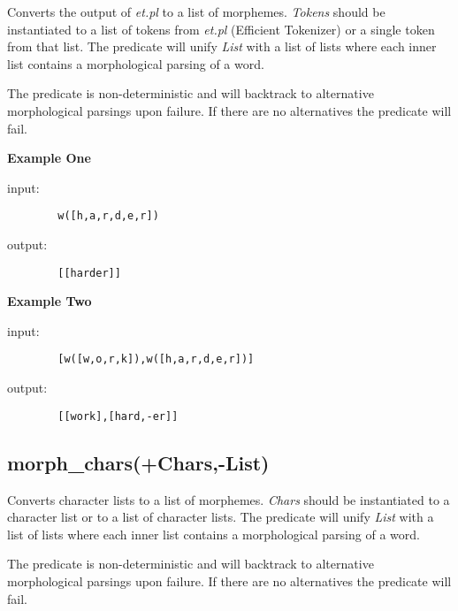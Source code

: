 Converts the output of \emph{et.pl} to a list of morphemes.
\emph{Tokens} should be instantiated to a list of tokens from
\emph{et.pl} (Efficient Tokenizer) or a single token from that
list.  The predicate will unify \emph{List} with a list of lists
where each inner list contains a morphological parsing of a word.
\newline

The predicate is non-deterministic and will backtrack to
alternative morphological parsings upon failure.  If there are no
alternatives the predicate will fail.\newline

\textbf{Example One}\newline

input:

        \begin{verbatim}
        w([h,a,r,d,e,r])\end{verbatim}

output:

        \begin{verbatim}
        [[harder]]\end{verbatim}

\textbf{Example Two}\newline

input:

        \begin{verbatim}
        [w([w,o,r,k]),w([h,a,r,d,e,r])]\end{verbatim}

output:

        \begin{verbatim}
        [[work],[hard,-er]]\end{verbatim}

\subsection{morph\_chars(+Chars,-List)}

Converts character lists to a list of morphemes. \emph{Chars}
should be instantiated to a character list or to a list of
character lists. The predicate will unify \emph{List} with a list
of lists where each inner list contains a morphological parsing of
a word.\newline

The predicate is non-deterministic and will backtrack to
alternative morphological parsings upon failure.  If there are no
alternatives the predicate will fail.\newline

